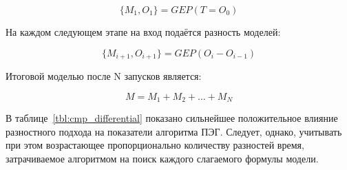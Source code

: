 \begin{equation}
\label{eq:zerg_diff_m_1}
\{M_{1}, O_{1}\} = GEP(T = O_{0})
\end{equation}

На каждом следующем этапе на вход подаётся разность моделей:

\begin{equation}
\label{eq:zerg_diff_m_i}
\{M_{i+1}, O_{i+1}\} = GEP(O_{i} - O_{i - 1})
\end{equation}

Итоговой моделью после N запусков является:

\begin{equation}
\label{eq:zerg_diff_model}
M = M_{1} + M_{2} + \ldots + M_{N}
\end{equation}

В таблице~\ref{tbl:cmp_differential} показано сильнейшее положительное влияние разностного подхода на показатели алгоритма ПЭГ. Следует, однако, учитывать при этом возрастающее пропорционально количеству разностей время, затрачиваемое алгоритмом на поиск каждого слагаемого формулы модели.

